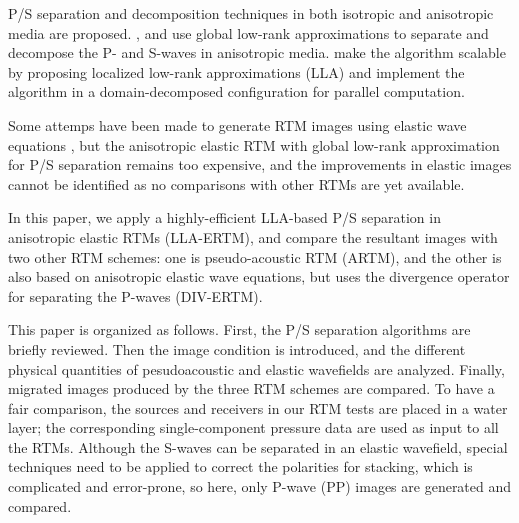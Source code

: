 \documentclass[manuscript,ulem,graphix,revised]{geophysics}
\begin{document}
P/S separation and decomposition techniques in both isotropic \citep{morse53, sun99, wenlong15} and anisotropic \citep{dellinger90,zhang10} media are proposed. \citet{cheng14}, \citet{cheng16} and \citet{Sripanich16} use global low-rank approximations to separate and decompose the P- and S-waves in anisotropic media. \citet{wenlong17} make the algorithm scalable by proposing localized low-rank approximations (LLA) and implement the algorithm in a domain-decomposed configuration for parallel computation.

Some attemps have been made to generate RTM images using elastic wave equations \citep{yan07,wenlong15b,wang16}, but the anisotropic elastic RTM with global low-rank approximation for P/S separation remains too expensive, and the improvements in elastic images cannot be identified as no comparisons with other RTMs are yet available.

\marginnote{[13]}In this paper, we  apply a highly-efficient LLA-based P/S separation in anisotropic elastic RTMs (LLA-ERTM), and compare the resultant images with two other RTM schemes: one is pseudo-acoustic RTM (ARTM), and the other is also based on anisotropic elastic wave equations, but uses the divergence operator for separating the P-waves (DIV-ERTM). 

This paper is organized as follows. First, the P/S separation algorithms are briefly reviewed. Then the image condition is introduced, and the different physical quantities of pesudoacoustic and elastic wavefields are analyzed. Finally, migrated images produced by the three RTM schemes are compared. 
To have a fair comparison, the sources and receivers in our RTM tests are placed in a water layer; the corresponding single-component pressure data are used as input to all the RTMs. Although the S-waves can be separated in an elastic wavefield, special techniques need to be applied to correct the polarities for stacking, which is complicated and error-prone, so here, only P-wave (PP) images are generated and compared.

\end{document}
